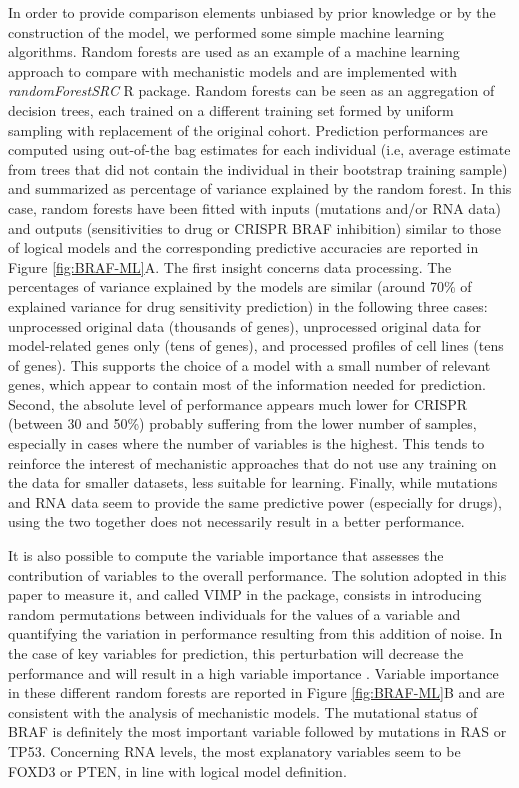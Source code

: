 \documentclass[a4paper,12pt,twoside,onecolumn,openright,final,oldfontcommands]{memoir}
\begin{document}
In order to provide comparison elements unbiased by prior knowledge or
by the construction of the model, we performed some simple machine
learning algorithms. Random forests are used as an example of a machine
learning approach to compare with mechanistic models
\citep{breiman2001random} and are implemented with
\emph{randomForestSRC} R package. Random forests can be seen as an
aggregation of decision trees, each trained on a different training set
formed by uniform sampling with replacement of the original cohort.
Prediction performances are computed using out-of-the bag estimates for
each individual (i.e, average estimate from trees that did not contain
the individual in their bootstrap training sample) and summarized as
percentage of variance explained by the random forest. In this case,
random forests have been fitted with inputs (mutations and/or RNA data)
and outputs (sensitivities to drug or CRISPR BRAF inhibition) similar to
those of logical models and the corresponding predictive accuracies are
reported in Figure \ref{fig:BRAF-ML}A. The first insight concerns data
processing. The percentages of variance explained by the models are
similar (around 70\% of explained variance for drug sensitivity
prediction) in the following three cases: unprocessed original data
(thousands of genes), unprocessed original data for model-related genes
only (tens of genes), and processed profiles of cell lines (tens of
genes). This supports the choice of a model with a small number of
relevant genes, which appear to contain most of the information needed
for prediction. Second, the absolute level of performance appears much
lower for CRISPR (between 30 and 50\%) probably suffering from the lower
number of samples, especially in cases where the number of variables is
the highest. This tends to reinforce the interest of mechanistic
approaches that do not use any training on the data for smaller
datasets, less suitable for learning. Finally, while mutations and RNA
data seem to provide the same predictive power (especially for drugs),
using the two together does not necessarily result in a better
performance.

It is also possible to compute the variable importance that assesses the
contribution of variables to the overall performance. The solution
adopted in this paper to measure it, and called VIMP in the package,
consists in introducing random permutations between individuals for the
values of a variable and quantifying the variation in performance
resulting from this addition of noise. In the case of key variables for
prediction, this perturbation will decrease the performance and will
result in a high variable importance \citep{ishwaran2007variable}.
Variable importance in these different random forests are reported in
Figure \ref{fig:BRAF-ML}B and are consistent with the analysis of
mechanistic models. The mutational status of BRAF is definitely the most
important variable followed by mutations in RAS or TP53. Concerning RNA
levels, the most explanatory variables seem to be FOXD3 or PTEN, in line
with logical model definition.
\end{document}
